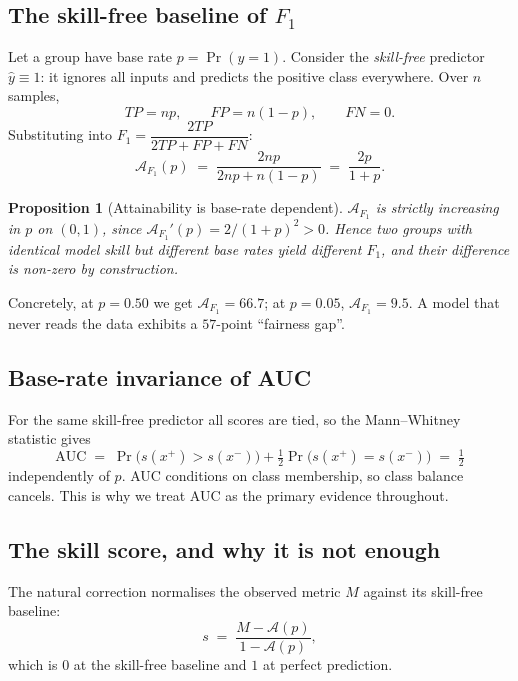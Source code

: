\documentclass[11pt,a4paper]{article}
\newtheorem{proposition}{Proposition}
\newcommand{\A}{\mathcal{A}}
\begin{document}
\subsection{The skill-free baseline of $F_1$}
Let a group have base rate $p = \Pr(y=1)$. Consider the \emph{skill-free}
predictor $\hat{y}\equiv 1$: it ignores all inputs and predicts the positive
class everywhere. Over $n$ samples,
\[
TP = np, \qquad FP = n(1-p), \qquad FN = 0 .
\]
Substituting into $F_1 = \dfrac{2TP}{2TP + FP + FN}$:
\begin{equation}
\A_{F_1}(p) \;=\; \frac{2np}{2np + n(1-p)} \;=\; \frac{2p}{1+p}.
\label{eq:af1}
\end{equation}

\begin{proposition}[Attainability is base-rate dependent]
$\A_{F_1}$ is strictly increasing in $p$ on $(0,1)$, since
$\A_{F_1}'(p) = 2/(1+p)^2 > 0$. Hence two groups with identical model
skill but different base rates yield different $F_1$, and their difference is
non-zero by construction.
\end{proposition}

\noindent Concretely, at $p=0.50$ we get $\A_{F_1} = 66.7$; at $p=0.05$,
$\A_{F_1}=9.5$. A model that never reads the data exhibits a $57$-point
``fairness gap''.

\subsection{Base-rate invariance of AUC}
For the same skill-free predictor all scores are tied, so the Mann--Whitney
statistic gives
\begin{equation}
\mathrm{AUC} \;=\; \Pr\!\big(s(x^+) > s(x^-)\big) + \tfrac12\Pr\!\big(s(x^+)=s(x^-)\big) \;=\; \tfrac12
\label{eq:auc}
\end{equation}
independently of $p$. AUC conditions on class membership, so class balance
cancels. This is why we treat AUC as the primary evidence throughout.

\subsection{The skill score, and why it is not enough}
The natural correction normalises the observed metric $M$ against its skill-free
baseline:
\begin{equation}
s \;=\; \frac{M - \A(p)}{1 - \A(p)},
\label{eq:skill}
\end{equation}
which is $0$ at the skill-free baseline and $1$ at perfect prediction.
\end{document}
